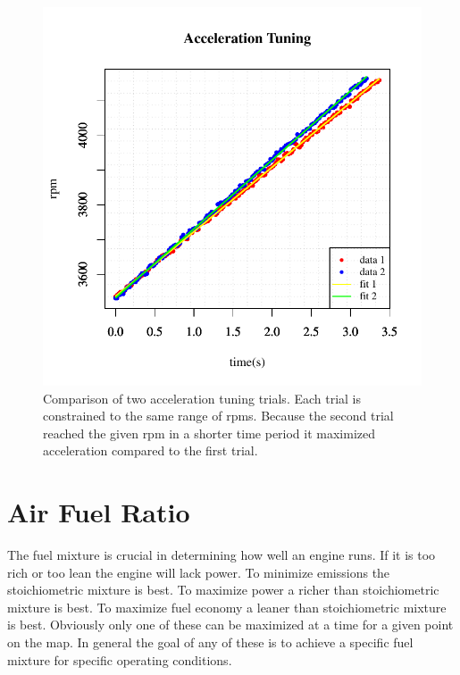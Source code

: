 \documentclass{article}
\begin{document}
\begin{figure}[!htbp]
\center
\includegraphics[scale=0.8]{msq-accel-4g_52cm_45-65mph-20110627-20:17:43-rtdata-single}
\caption{Comparison of two acceleration tuning trials.
Each trial is constrained to the same range of rpms.
Because the second trial reached the given rpm in a shorter time
period it maximized acceleration compared to the first trial.}
\label{fig:acctun}
\end{figure}




\section{Air Fuel Ratio}
\label{sec:afr}

The fuel mixture is crucial in determining how well an engine runs.
If it is too rich or too lean the engine will lack power.
To minimize emissions the stoichiometric mixture is best.
To maximize power a richer than stoichiometric mixture is best.
To maximize fuel economy a leaner than stoichiometric mixture is best.
Obviously only one of these can be maximized at a time for a given
point on the map.
In general the goal of any of these is to achieve a specific fuel
mixture for specific operating conditions.
\end{document}
